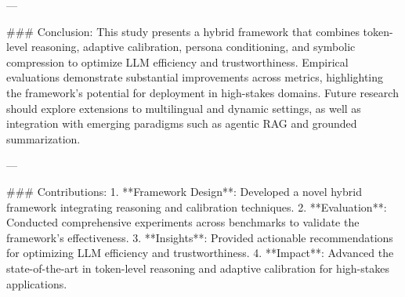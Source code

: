 ---

### Conclusion:
This study presents a hybrid framework that combines token-level reasoning, adaptive calibration, persona conditioning, and symbolic compression to optimize LLM efficiency and trustworthiness. Empirical evaluations demonstrate substantial improvements across metrics, highlighting the framework's potential for deployment in high-stakes domains. Future research should explore extensions to multilingual and dynamic settings, as well as integration with emerging paradigms such as agentic RAG and grounded summarization.

---

### Contributions:
1. **Framework Design**: Developed a novel hybrid framework integrating reasoning and calibration techniques.
2. **Evaluation**: Conducted comprehensive experiments across benchmarks to validate the framework's effectiveness.
3. **Insights**: Provided actionable recommendations for optimizing LLM efficiency and trustworthiness.
4. **Impact**: Advanced the state-of-the-art in token-level reasoning and adaptive calibration for high-stakes applications. 

